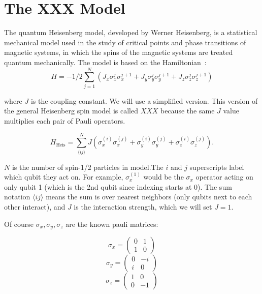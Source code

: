 \section{The XXX Model}\label{sec:xxx}

The quantum Heisenberg model, developed by Werner Heisenberg, is a statistical mechanical model used in the study of critical points and phase transitions of magnetic systems, in which the spins of the magnetic systems are treated quantum mechanically. The model is based on the Hamiltonian~\cite{enwiki:1068863987}:
    \begin{equation}
        H = -1/2 \sum_{j=1}^{N} (J_x \sigma_x^{j} \sigma_x^{j+1} + J_y \sigma_y^{j} \sigma_y^{j+1} + J_z \sigma_z^{j} \sigma_z^{j+1})
     \end{equation}

     where $J$ is the coupling constant. We will use a simplified version. This version of the general Heisenberg spin model is called $XXX$ because the same $J$ value multiplies each pair of Pauli operators.




     \begin{equation}
        H_{\text{Heis}} = \sum_{\langle ij \rangle}^{N} J \left(\sigma_x^{(i)}\sigma_x^{(j)} + \sigma_y^{(i)}\sigma_y^{(j)} + \sigma_z^{(i)}\sigma_z^{(j)}\right).
     \end{equation}
    
    
    $N$ is the number of spin-1/2 particles in model.The $i$ and $j$ superscripts label which qubit they act on. For example, $\sigma_x^{(1)}$ would be the $\sigma_x$ operator acting on only qubit 1 (which is the 2nd qubit since indexing starts at 0). The sum notation $\langle ij \rangle$ means the sum is over nearest neighbors (only qubits next to each other interact), and $J$ is the interaction strength, which we will set $J=1$.

    

    Of course $\sigma_x, \sigma_y, \sigma_z$ are the known pauli matrices: 

\[
    \sigma_x =
    \begin{pmatrix}0&1\\1&0\end{pmatrix}
    \]
    \[
    \sigma_y =
    \begin{pmatrix}0&-i\\i&0\end{pmatrix} 
    \]
    \[
    \sigma_z =
    \begin{pmatrix}1&0\\0&-1\end{pmatrix} 
    \]


